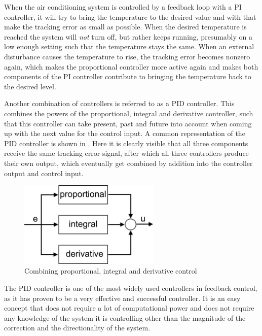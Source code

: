 When the air conditioning system is controlled by a feedback loop with a PI controller, it will try to bring the temperature to the desired value and with that make the tracking error as small as possible. When the desired temperature is reached the system will \emph{not} turn off, but rather keeps running, presumably on a low enough setting such that the temperature stays the same. When an external disturbance causes the temperature to rise, the tracking error becomes nonzero again, which makes the proportional controller more active again and makes both components of the PI controller contribute to bringing the temperature back to the desired level.

Another combination of controllers is referred to as a PID controller. This combines the powers of the proportional, integral and derivative controller, such that this controller can take present, past and future into account when coming up with the next value for the control input. A common representation of the PID controller is shown in . Here it is clearly visible that all three components receive the same tracking error signal, after which all three controllers produce their own output, which eventually get combined by addition into the controller output and control input.

\begin{figure}[H]
	\begin{center}
		\includegraphics[width=0.60\textwidth]{figures/pid.png}
	\end{center}
	\caption{Combining proportional, integral and derivative control}
	\label{fig:pid}
\end{figure}

The PID controller is one of the most widely used controllers in feedback control, as it has proven to be a very effective and successful controller. It is an easy concept that does not require a lot of computational power and does not require any knowledge of the system it is controlling other than the magnitude of the correction and the directionality of the system.


